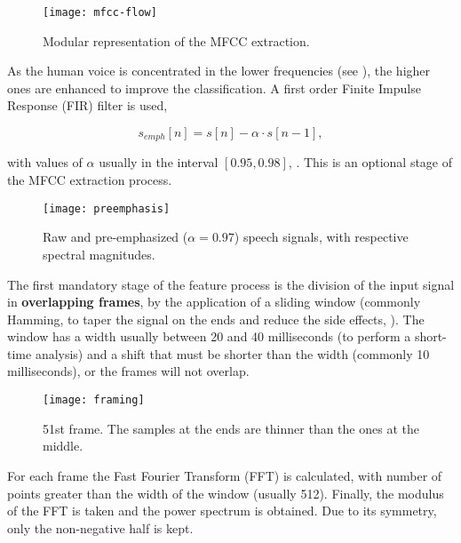 \begin{figure}[ht]
    \centering
    \texttt{[image: mfcc-flow]}
    \caption{Modular representation of the MFCC extraction.}
    \label{fig:mfcc-flow}
\end{figure}


As the human voice is concentrated in the lower frequencies (see ), the higher ones are enhanced to improve the classification. A first order Finite Impulse Response (FIR) filter is used,

\begin{equation}
    s_{emph}[n] = s[n] - \alpha \cdot s[n - 1],
    \label{eq:preemphasis}
\end{equation}

\noindent with values of $\alpha$ usually in the interval $[0.95, 0.98]$, . This is an optional stage of the MFCC extraction process.

\begin{figure}[ht]
    \centering
    \texttt{[image: preemphasis]}
    \caption{Raw and pre-emphasized ($\alpha = 0.97$) speech signals, with respective spectral magnitudes.}
    \label{fig:preemphasis}
\end{figure}


The first mandatory stage of the feature process is the division of the input signal in \textbf{overlapping frames}, by the application of a sliding window (commonly Hamming, to taper the signal on the ends and reduce the side effects, ). The window has a width usually between 20 and 40 milliseconds (to perform a short-time analysis) and a shift that must be shorter than the width (commonly 10 milliseconds), or the frames will not overlap.

\begin{figure}[ht]
    \centering
    \texttt{[image: framing]}
    \caption{51st frame. The samples at the ends are thinner than the ones at the middle.}
    \label{fig:framing}
\end{figure}


For each frame the Fast Fourier Transform (FFT) is calculated, with number of points greater than the width of the window (usually 512). Finally, the modulus of the FFT is taken and the power spectrum is obtained. Due to its symmetry, only the non-negative half is kept.

